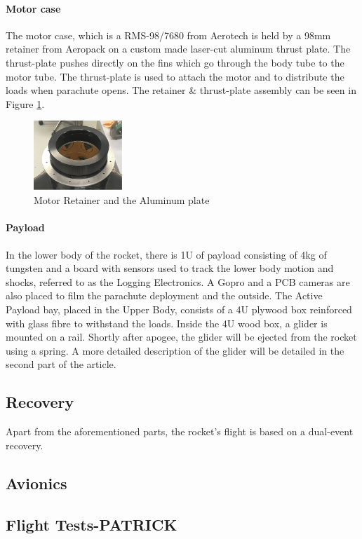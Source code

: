 \paragraph{Motor case}
\hfill \break
The motor case, which is a RMS-98/7680 from Aerotech is held by a 98mm retainer from Aeropack on a custom made laser-cut aluminum thrust plate. The thrust-plate pushes directly on the fins which go through the body tube to the motor tube. The thrust-plate is used to attach the motor and to distribute the loads when parachute opens.
 The retainer \& thrust-plate assembly can be seen in Figure \ref{f:motor_retainer_2}.
\begin{figure}[h!]
        \centering
        \includegraphics[width=0.3\textwidth]{img/motor_retainer.png}
        \caption{Motor Retainer and the Aluminum plate}
        \label{f:motor_retainer_2}
    \end{figure}


\paragraph{Payload}
\hfill \break
In the lower body of the rocket, there is 1U of payload consisting of 4kg of tungsten and a board with sensors used to track the lower body motion and shocks, referred to as the Logging Electronics. A Gopro and a PCB cameras are also placed to film the parachute deployment and the outside.
The Active Payload bay, placed in the Upper Body, consists of a 4U plywood box reinforced with glass fibre to withstand the loads. Inside the 4U wood box, a glider is mounted on a rail. Shortly after apogee, the glider will be ejected from the rocket using a spring. A more detailed description of the glider will be detailed in the second part of the article.



\subsection{Recovery}

Apart from the aforementioned parts, the rocket's flight is based on a dual-event recovery.

\subsection{Avionics}



\subsection{Flight Tests-PATRICK}